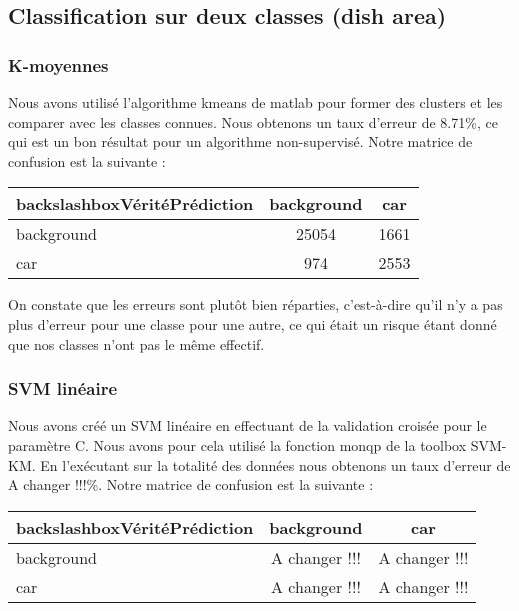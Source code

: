 	\subsection{Classification sur deux classes (dish area)}
		\subsubsection{K-moyennes}
			Nous avons utilisé l'algorithme kmeans de matlab pour former des clusters et les comparer avec les classes connues. Nous obtenons un taux d'erreur de 8.71\%, ce qui est un bon résultat pour un algorithme non-supervisé. Notre matrice de confusion est la suivante :

			\begin{center}
				\begin{tabular}{|l||c|c|}
				  \hline
				  backslashbox{Vérité}{Prédiction}& background & car \\
				  \hline
				  background & 25054 & 1661 \\
				  \hline
				  car & 974 & 2553 \\
				  \hline
				\end{tabular}
			\end{center}

			On constate que les erreurs sont plutôt bien réparties, c'est-à-dire qu'il n'y a pas plus d'erreur pour une classe pour une autre, ce qui était un risque étant donné que nos classes n'ont pas le même effectif.

		\subsubsection{SVM linéaire}
			Nous avons créé un SVM linéaire en effectuant de la validation croisée pour le paramètre C. Nous avons pour cela utilisé la fonction monqp de la toolbox SVM-KM. En l’exécutant sur la totalité des données nous obtenons un taux d'erreur de A changer !!!\%. Notre matrice de confusion est la suivante :
			\begin{center}
				\begin{tabular}{|l||c|c|}
				  \hline
				  backslashbox{Vérité}{Prédiction}& background & car \\
				  \hline
				  background & A changer !!! & A changer !!! \\
				  \hline
				  car & A changer !!! & A changer !!! \\
				  \hline
				\end{tabular}
			\end{center}

